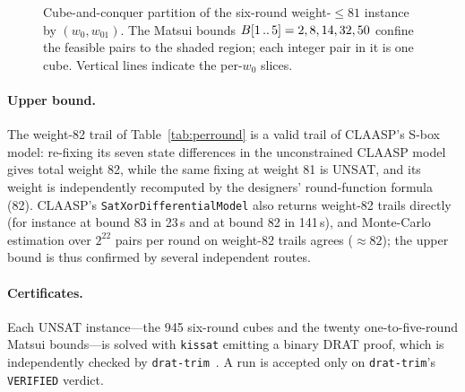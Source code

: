 \documentclass[11pt]{article}
\begin{document}
\begin{figure}[t]
\centering
{}
\caption{Cube-and-conquer partition of the six-round weight-$\le 81$ instance by $(w_0,w_{01})$. The Matsui bounds $B[1\mathinner{..}5]=2,8,14,32,50$ confine the feasible pairs to the shaded region; each integer pair in it is one cube. Vertical lines indicate the per-$w_0$ slices.}
\label{fig:cubes}
\end{figure}

\paragraph{Upper bound.} The weight-82 trail of Table~\ref{tab:perround} is a valid trail of CLAASP's S-box model: re-fixing its seven state differences in the unconstrained CLAASP model gives total weight 82, while the same fixing at weight 81 is UNSAT, and its weight is independently recomputed by the designers' round-function formula (82). CLAASP's \texttt{SatXorDifferentialModel} also returns weight-82 trails directly (for instance at bound 83 in 23\,s and at bound 82 in 141\,s), and Monte-Carlo estimation over $2^{22}$ pairs per round on weight-82 trails agrees ($\approx 82$); the upper bound is thus confirmed by several independent routes.

\paragraph{Certificates.} Each UNSAT instance---the 945 six-round cubes and the twenty one-to-five-round Matsui bounds---is solved with \texttt{kissat} emitting a binary DRAT proof, which is independently checked by \texttt{drat-trim}~\cite{drattrim}. A run is accepted only on \texttt{drat-trim}'s \texttt{VERIFIED} verdict.
\end{document}
